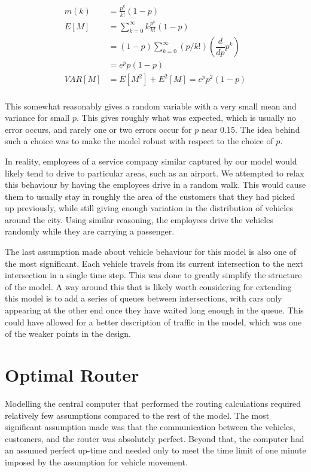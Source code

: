 \documentclass[Proceedings]{ascelike}
\begin{document}
\begin{align*}
    m(k) &= \frac{p^{k}}{k!} (1 - p) \\
    E[M] &= \sum_{k=0}^{\infty} k \frac{p^{k}}{k!} (1 - p) \\
    &= (1 - p) \sum_{k=0}^{\infty} (p/k!) \left(\dfrac{d}{dp} p^{k} \right) \\
    &= e^{p} p (1 - p) \\
    VAR[M] &= E[M^{2}] + E^{2}[M] = e^{p} p^{2} (1 - p) \\
\end{align*}

This somewhat reasonably gives a random variable with a very small mean and variance for small \( p \). This gives
roughly what was expected, which is usually no error occurs, and rarely one or two errors occur for \( p \) near
0.15. The idea behind such a choice was to make the model robust with respect to the choice of \( p \).

In reality, employees of a service company similar captured by our model would likely tend to drive to particular
areas, such as an airport. We attempted to relax this behaviour by having the employees drive in a random walk. This
would cause them to usually stay in roughly the area of the customers that they had picked up previously, while
still giving enough variation in the distribution of vehicles around the city. Using similar reasoning, the employees
drive the vehicles randomly while they are carrying a passenger.

The last assumption made about vehicle behaviour for this model is also one of the most significant. Each vehicle
travels from its current intersection to the next intersection in a single time step. This was done to greatly
simplify the structure of the model. A way around this that is likely worth considering for extending this model
is to add a series of queues between intersections, with cars only appearing at the other end once they have
waited long enough in the queue. This could have allowed for a better description of traffic in the model, which
was one of the weaker points in the design.

\section*{Optimal Router}

Modelling the central computer that performed the routing calculations required relatively few assumptions compared
to the rest of the model. The most significant assumption made was that the communication between the vehicles,
customers, and the router was absolutely perfect. Beyond that, the computer had an assumed perfect up-time and needed
only to meet the time limit of one minute imposed by the assumption for vehicle movement.
\end{document}
